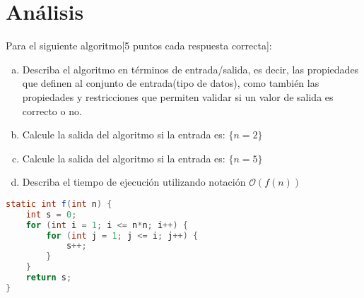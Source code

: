 \documentclass{exam}
\begin{document}
\newpage 
\section{Análisis}
Para el siguiente algoritmo[5 puntos cada respuesta correcta]:
\begin{enumerate}[a.]
    \item Describa el algoritmo en términos de entrada/salida, es decir, las propiedades que definen al conjunto de entrada(tipo de datos), como también las propiedades y restricciones que permiten validar si un valor de salida es correcto o no.
    \item Calcule la salida del algoritmo si la entrada es: $\{ n = 2\}$
    \item Calcule la salida del algoritmo si la entrada es: $\{ n = 5\}$
    \item Describa el tiempo de ejecución utilizando notación $\mathcal{O}(f(n))$
\end{enumerate}
\begin{lstlisting}[language=java]
static int f(int n) {
    int s = 0;
    for (int i = 1; i <= n*n; i++) {
        for (int j = 1; j <= i; j++) {
            s++;
        }
    }
    return s;
}
\end{lstlisting}
\end{document}
